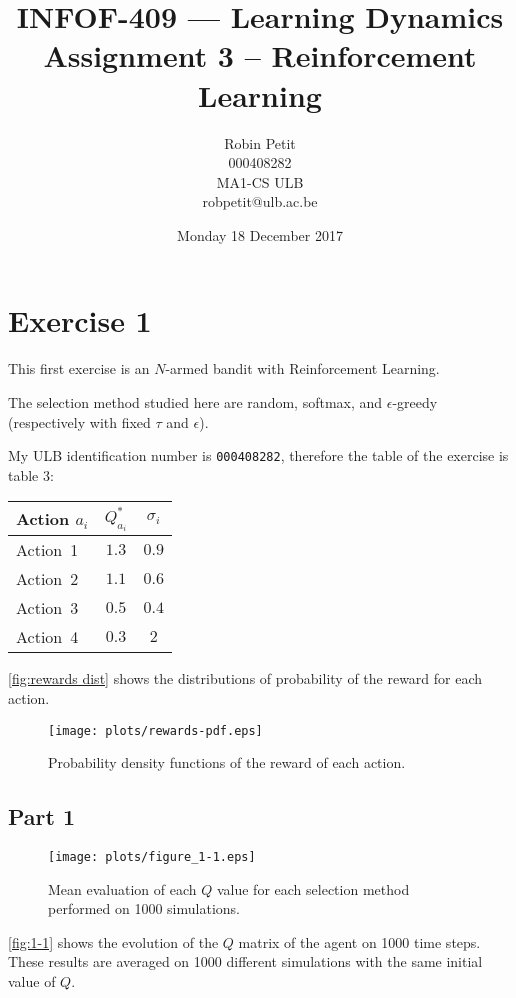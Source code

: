 \documentclass{article}
\title{INFOF-409 --- Learning Dynamics\\Assignment 3 -- Reinforcement Learning}
\date{Monday 18 December 2017}
\author{Robin Petit\\000408282\\MA1-CS ULB\\robpetit@ulb.ac.be}
\begin{document}
\maketitle

\section{Exercise 1}
This first exercise is an $N$-armed bandit with Reinforcement Learning.

The selection method studied here are random, softmax, and $\epsilon$-greedy (respectively with fixed $\tau$ and $\epsilon$).

My ULB identification number is \texttt{000408282}, therefore the table of the exercise is table 3:
\begin{table*}[!h]
\center
\begin{tabular}{l|c|c}
\textbf{Action} $a_i$ & $Q_{a_i}^*$ & $\sigma_i$ \\ \hline \hline
Action~1 & $1.3$ & $0.9$ \\ \hline
Action~2 & $1.1$ & $0.6$ \\ \hline
Action~3 & $0.5$ & $0.4$ \\ \hline
Action~4 & $0.3$ & $2$
\end{tabular}
\end{table*}


\autoref{fig:rewards dist} shows the distributions of probability of the reward for each action.

\begin{figure}[!h]
\centering
\texttt{[image: plots/rewards-pdf.eps]}
\caption{Probability density functions of the reward of each action.\label{fig:rewards dist}}
\end{figure}

\subsection{Part 1}

\begin{figure}[!b]
\hspace{-3cm}
\texttt{[image: plots/figure\_1-1.eps]}
\caption{Mean evaluation of each $Q$ value for each selection method performed on 1000 simulations.\label{fig:1-1}}
\end{figure}

\autoref{fig:1-1} shows the evolution of the $Q$ matrix of the agent on 1000 time steps. These results are averaged on
1000 different simulations with the same initial value of $Q$.
\end{document}
